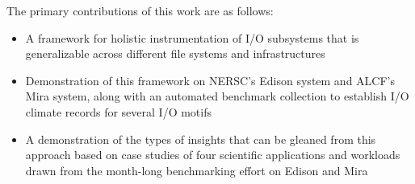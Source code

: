 The primary contributions of this work are as follows:

\begin{itemize}
\item A framework for holistic instrumentation of I/O subsystems that is generalizable across different file systems and infrastructures
\item Demonstration of this framework on NERSC's Edison system and ALCF's Mira system, along with an automated benchmark collection to establish I/O climate records for several I/O motifs
\item A demonstration of the types of insights that can be gleaned from this approach based on case studies of four scientific applications and workloads drawn from the month-long benchmarking effort on Edison and Mira
\end{itemize}

